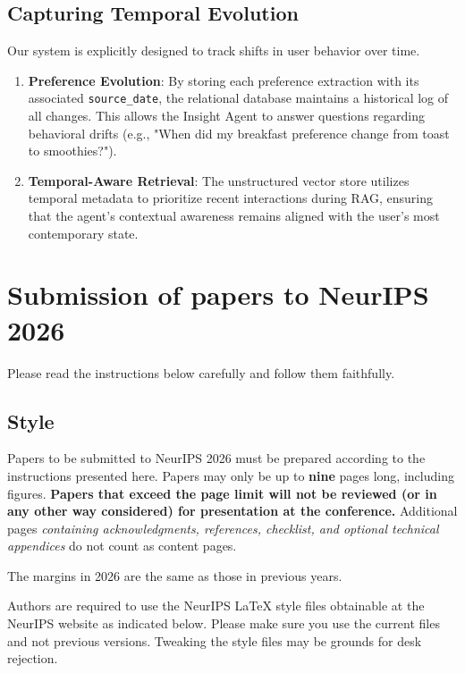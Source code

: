 \documentclass{article}
\begin{document}
\subsection{Capturing Temporal Evolution}
Our system is explicitly designed to track shifts in user behavior over time.
\begin{enumerate}
    \item \textbf{Preference Evolution}: By storing each preference extraction with its associated \texttt{source\_date}, the relational database maintains a historical log of all changes. This allows the Insight Agent to answer questions regarding behavioral drifts (e.g., "When did my breakfast preference change from toast to smoothies?").
    \item \textbf{Temporal-Aware Retrieval}: The unstructured vector store utilizes temporal metadata to prioritize recent interactions during RAG, ensuring that the agent's contextual awareness remains aligned with the user's most contemporary state.
\end{enumerate}



\section{Submission of papers to NeurIPS 2026}


Please read the instructions below carefully and follow them faithfully.


\subsection{Style}


Papers to be submitted to NeurIPS 2026 must be prepared according to the
instructions presented here. Papers may only be up to {\bf nine} pages long, including figures. \textbf{Papers that exceed the page limit will not be reviewed (or in any other way considered) for presentation at the conference.}
Additional pages \emph{containing acknowledgments, references, checklist, and optional technical appendices} do not count as content pages. 


The margins in 2026 are the same as those in previous years.


Authors are required to use the NeurIPS \LaTeX{} style files obtainable at the NeurIPS website as indicated below. Please make sure you use the current files and not previous versions. Tweaking the style files may be grounds for desk rejection.
\end{document}
